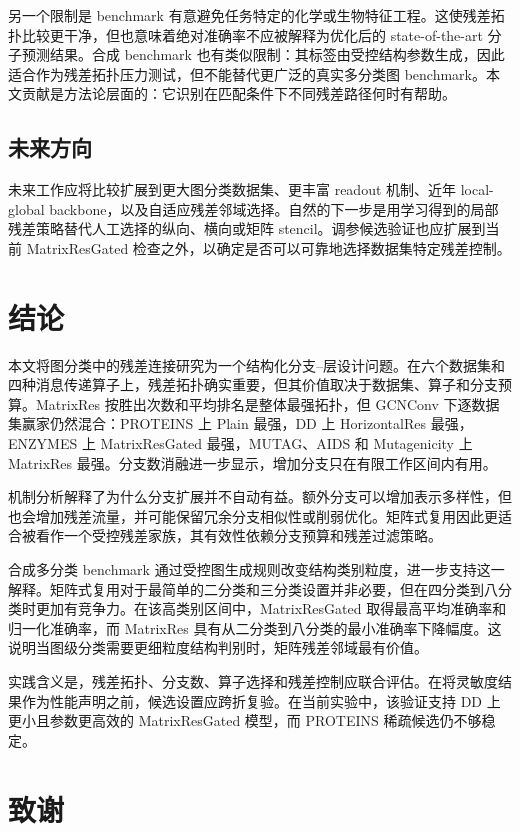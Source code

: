 \documentclass[UTF8,10pt]{ctexart}
\begin{document}
另一个限制是 benchmark 有意避免任务特定的化学或生物特征工程。这使残差拓扑比较更干净，但也意味着绝对准确率不应被解释为优化后的 state-of-the-art 分子预测结果。合成 benchmark 也有类似限制：其标签由受控结构参数生成，因此适合作为残差拓扑压力测试，但不能替代更广泛的真实多分类图 benchmark。本文贡献是方法论层面的：它识别在匹配条件下不同残差路径何时有帮助。

\subsection{未来方向}

未来工作应将比较扩展到更大图分类数据集、更丰富 readout 机制、近年 local-global backbone，以及自适应残差邻域选择。自然的下一步是用学习得到的局部残差策略替代人工选择的纵向、横向或矩阵 stencil。调参候选验证也应扩展到当前 MatrixResGated 检查之外，以确定是否可以可靠地选择数据集特定残差控制。

\section{结论}
\label{sec:conclusion}

本文将图分类中的残差连接研究为一个结构化分支--层设计问题。在六个数据集和四种消息传递算子上，残差拓扑确实重要，但其价值取决于数据集、算子和分支预算。MatrixRes 按胜出次数和平均排名是整体最强拓扑，但 GCNConv 下逐数据集赢家仍然混合：PROTEINS 上 Plain 最强，DD 上 HorizontalRes 最强，ENZYMES 上 MatrixResGated 最强，MUTAG、AIDS 和 Mutagenicity 上 MatrixRes 最强。分支数消融进一步显示，增加分支只在有限工作区间内有用。

机制分析解释了为什么分支扩展并不自动有益。额外分支可以增加表示多样性，但也会增加残差流量，并可能保留冗余分支相似性或削弱优化。矩阵式复用因此更适合被看作一个受控残差家族，其有效性依赖分支预算和残差过滤策略。

合成多分类 benchmark 通过受控图生成规则改变结构类别粒度，进一步支持这一解释。矩阵式复用对于最简单的二分类和三分类设置并非必要，但在四分类到八分类时更加有竞争力。在该高类别区间中，MatrixResGated 取得最高平均准确率和归一化准确率，而 MatrixRes 具有从二分类到八分类的最小准确率下降幅度。这说明当图级分类需要更细粒度结构判别时，矩阵残差邻域最有价值。

实践含义是，残差拓扑、分支数、算子选择和残差控制应联合评估。在将灵敏度结果作为性能声明之前，候选设置应跨折复验。在当前实验中，该验证支持 DD 上更小且参数更高效的 MatrixResGated 模型，而 PROTEINS 稀疏候选仍不够稳定。

\section{致谢}
\end{document}
